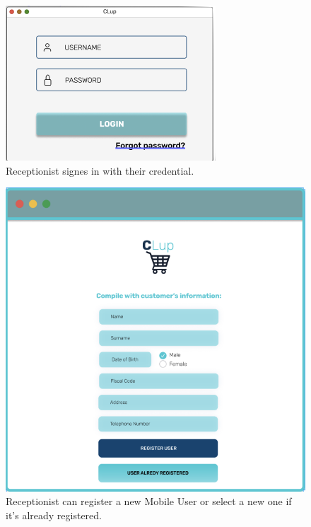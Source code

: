 \begin{figure}[H]
  \caption{Receptionist signes in with their credential.}
  \label{fig:Login}
  \centering
  \includegraphics[scale=0.55]{images/mockup/LOGIN_REC.png}

\end{figure}

\begin{figure}[H]
  \caption{Receptionist can register a new Mobile User or select a new one if it's already registered.}
  \label{fig:Login}
  \centering
  \includegraphics[scale=0.35]{images/mockup/LOGREG.png}

\end{figure}

